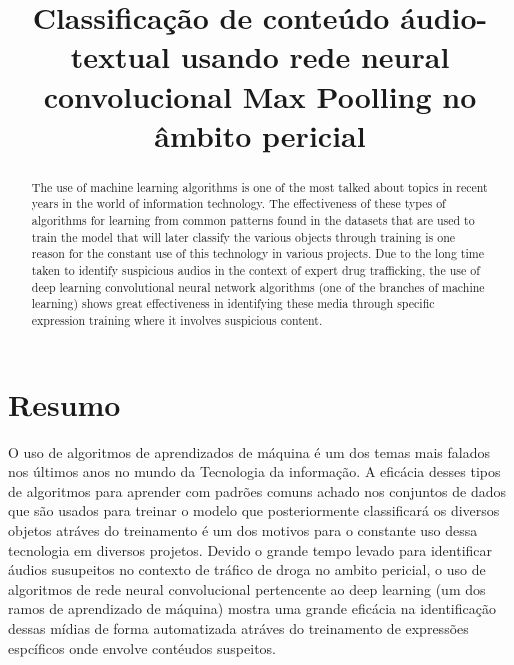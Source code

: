 \documentclass[conference]{IEEEtran}
\begin{document}
\title{Classificação de conteúdo áudio-textual usando rede neural convolucional Max Poolling no âmbito pericial}

\author{
\and
{}

}

\maketitle

\begin{abstract}
The use of machine learning algorithms is one of the most talked about topics in recent years in the world of information technology. The effectiveness of these types of algorithms for learning from common patterns found in the datasets that are used to train the model that will later classify the various objects through training is one reason for the constant use of this technology in various projects. Due to the long time taken to identify suspicious audios in the context of expert drug trafficking, the use of deep learning convolutional neural network algorithms (one of the branches of machine learning) shows great effectiveness in identifying these media through specific expression training where it involves suspicious content.    
\end{abstract}

\section{Resumo}

O uso de algoritmos de aprendizados de máquina é um dos temas mais falados nos últimos anos no mundo da Tecnologia da informação. A eficácia desses tipos de algoritmos para aprender com padrões comuns achado nos conjuntos de dados que são usados para treinar o modelo que  posteriormente classificará os diversos objetos atráves do treinamento é um dos motivos para o constante uso dessa tecnologia em diversos projetos. Devido o grande tempo levado para identificar áudios susupeitos no contexto de tráfico de droga no ambito pericial, o uso de algoritmos de rede neural convolucional pertencente ao deep learning (um dos ramos de aprendizado de máquina) mostra uma grande eficácia na identificação dessas mídias de forma automatizada atráves do treinamento de expressões espcíficos onde envolve contéudos suspeitos. 
\end{document}
